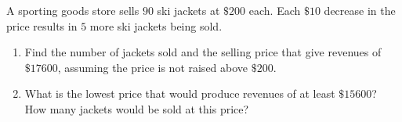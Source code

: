 A sporting goods store sells $90$ ski jackets at $\$200$ each. Each $\$10$ decrease in the price results in $5$ more ski jackets being sold.
\begin{enumerate}
\item[(a)] Find the number of jackets sold and the selling price that give revenues of $\$17600$, assuming the price is not raised above $\$200$.
\item[(b)] What is the lowest price that would produce revenues of at least $\$15600$? How many jackets would be sold at this price?
\end{enumerate}
